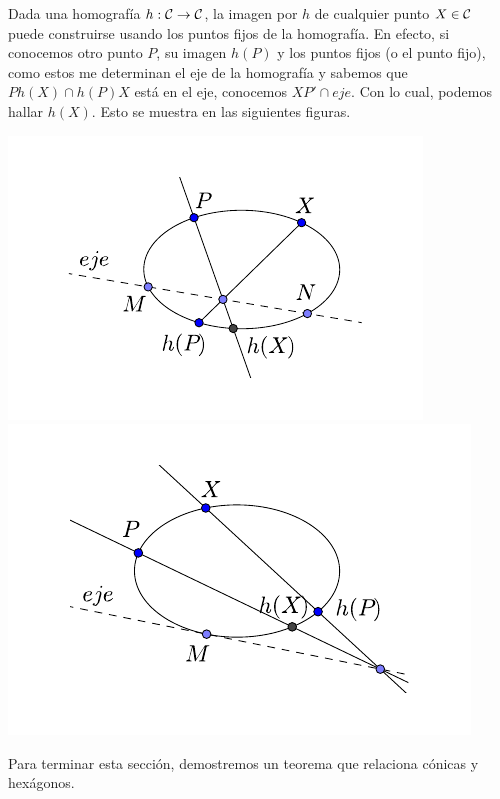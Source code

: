 \begin{obs}\label{C8_obs_determinaciom_homconica_eje}
	Dada una homografía $h:\mathcal{C}\rightarrow\mathcal{C}$, la imagen por $h$ de cualquier punto $X\in\mathcal{C}$ puede construirse usando los puntos fijos de la homografía. En efecto, si conocemos otro punto $P$, su imagen $h(P)$ y los puntos fijos (o el punto fijo), como estos me determinan el eje de la homografía y sabemos que $Ph(X)\cap h(P)X$ está en el eje, conocemos $XP'\cap eje$. Con lo cual, podemos hallar $h(X)$. Esto se muestra en las siguientes figuras.
	\begin{center}
		\includegraphics[scale=1]{Graficos/Conicas/TeoremaDelEje1} \
		\includegraphics[scale=.9]{Graficos/Conicas/TeoremaDelEje2}
	\end{center}
\end{obs}

Para terminar esta sección, demostremos un teorema que relaciona cónicas y hexágonos.

